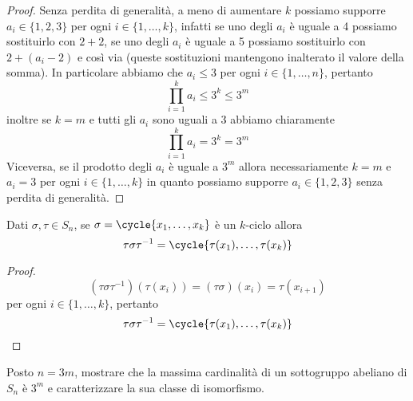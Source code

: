 \documentclass[11pt]{scrartcl}
\begin{document}
\begin{proof}
    Senza perdita di generalità, a meno di aumentare $k$ possiamo supporre
    $a_i \in \{1, 2, 3\}$ per ogni $i \in \{1, \ldots, k\}$, infatti se 
    uno degli $a_i$ è uguale a 4 possiamo sostituirlo con $2 + 2$, se uno degli
    $a_i$ è uguale a 5 possiamo sostituirlo con $2 + (a_i - 2)$ e così via
    (queste sostituzioni mantengono inalterato il valore della somma).
    In particolare abbiamo che $a_i \leqslant 3$ per ogni $i \in \{1, \ldots, n\}$,
    pertanto 
    \[
        \prod_{i = 1}^k a_i \leq 3^k \leq 3^m
    \]
    inoltre se $k = m$ e tutti gli $a_i$ sono uguali a 3 abbiamo chiaramente
    \[
        \prod_{i = 1}^k a_i = 3^k = 3^m
    \]
    Viceversa, se il prodotto degli $a_i$ è uguale a $3^m$ allora necessariamente
    $k = m$ e $a_i = 3$ per ogni $i \in \{1, \ldots, k\}$ in quanto possiamo
    supporre $a_i \in \{1, 2, 3\}$ senza perdita di generalità.
\end{proof}

\begin{lemma}
    \label{lemma5.0}
    Dati $\sigma, \tau \in S_n$, se $\sigma = \cycle{x_1, \ldots, x_k}$ è un 
    $k$-ciclo allora 
    \[
        \tau\sigma\tau^{-1} = \cycle{\tau(x_1),\ldots, \tau(x_k)}
    \]
\end{lemma}

\begin{proof}
    \[
        (\tau\sigma\tau^{-1})(\tau(x_i)) = (\tau\sigma)(x_i) = \tau(x_{i + 1})
    \]per ogni $i \in \{1, \ldots, k\}$, pertanto
    \[
        \tau\sigma\tau^{-1} = \cycle{\tau(x_1), \ldots, \tau(x_k)}
    \]
\end{proof}


\begin{exercise}
    Posto $n = 3m$, mostrare che la massima cardinalità di un sottogruppo
    abeliano di $S_n$ è $3^m$ e caratterizzare la sua classe di isomorfismo.
\end{exercise}
\end{document}

